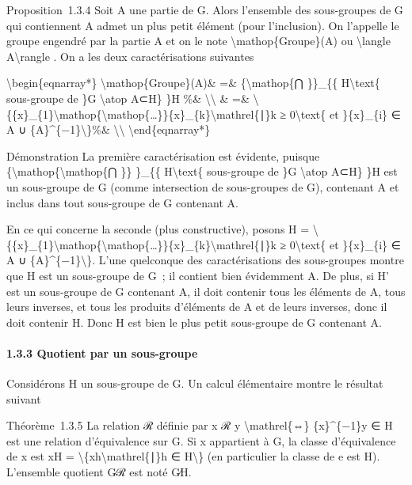 \documentclass[]{article}
\begin{document}
Proposition~1.3.4 Soit A une partie de G. Alors l'ensemble des
sous-groupes de G qui contiennent A admet un plus petit élément (pour
l'inclusion). On l'appelle le groupe engendré par la partie A et on le
note \textbackslash{}mathop\{Groupe\}(A) ou \textbackslash{}langle
A\textbackslash{}rangle . On a les deux caractérisations suivantes

\textbackslash{}begin\{eqnarray*\} \textbackslash{}mathop\{Groupe\}(A)\&
=\& \{\textbackslash{}mathop\{⋂ \}\}\_\{\{ H\textbackslash{}text\{
sous-groupe de \}G \textbackslash{}atop A⊂H\} \}H \%\&
\textbackslash{}\textbackslash{} \& =\&
\textbackslash{}\{\{x\}\_\{1\}\textbackslash{}mathop\{\textbackslash{}mathop\{\ldots{}\}\}\{x\}\_\{k\}\textbackslash{}mathrel\{∣\}k
≥ 0\textbackslash{}text\{ et \}\{x\}\_\{i\} ∈ A ∪
\{A\}\^{}\{−1\}\textbackslash{}\}\%\& \textbackslash{}\textbackslash{}
\textbackslash{}end\{eqnarray*\}

Démonstration La première caractérisation est évidente, puisque
\{\textbackslash{}mathop\{\textbackslash{}mathop\{⋂ \}\} \}\_\{\{
H\textbackslash{}text\{ sous-groupe de \}G \textbackslash{}atop A⊂H\}
\}H est un sous-groupe de G (comme intersection de sous-groupes de G),
contenant A et inclus dans tout sous-groupe de G contenant A.

En ce qui concerne la seconde (plus constructive), posons H =
\textbackslash{}\{\{x\}\_\{1\}\textbackslash{}mathop\{\textbackslash{}mathop\{\ldots{}\}\}\{x\}\_\{k\}\textbackslash{}mathrel\{∣\}k
≥ 0\textbackslash{}text\{ et \}\{x\}\_\{i\} ∈ A ∪
\{A\}\^{}\{−1\}\textbackslash{}\}. L'une quelconque des caractérisations
des sous-groupes montre que H est un sous-groupe de G~; il contient bien
évidemment A. De plus, si H' est un sous-groupe de G contenant A, il
doit contenir tous les éléments de A, tous leurs inverses, et tous les
produits d'éléments de A et de leurs inverses, donc il doit contenir H.
Donc H est bien le plus petit sous-groupe de G contenant A.

\paragraph{1.3.3 Quotient par un sous-groupe}

Considérons H un sous-groupe de G. Un calcul élémentaire montre le
résultat suivant

Théorème~1.3.5 La relation ℛ définie par x ℛ y
\textbackslash{}mathrel\{⇔\} \{x\}\^{}\{−1\}y ∈ H est une relation
d'équivalence sur G. Si x appartient à G, la classe d'équivalence de x
est xH = \textbackslash{}\{xh\textbackslash{}mathrel\{∣\}h ∈
H\textbackslash{}\} (en particulier la classe de e est H). L'ensemble
quotient G∕ℛ est noté G∕H.
\end{document}
